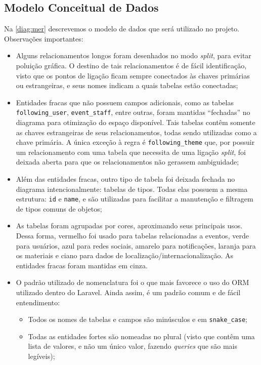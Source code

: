 \documentclass[12pt,a4paper,twoside,hyphens,english,brazil]{abntex2}
\begin{document}
{%
\subsection{Modelo Conceitual de Dados}
Na \autoref{diag:mer} descrevemos o modelo de dados que será utilizado no projeto. Observações importantes:
\begin{itemize}
	\item Alguns relacionamentos longos foram desenhados no modo \emph{split}, para evitar poluição gráfica. O destino de tais relacionamentos é de fácil identificação, visto que os pontos de ligação ficam sempre conectados às chaves primárias ou estrangeiras, e seus nomes indicam a quais tabelas estão conectadas;
	\item Entidades fracas que não possuem campos adicionais, como as tabelas \texttt{following\_user}, \texttt{event\_staff}, entre outras, foram mantidas ``fechadas'' no diagrama para otimização do espaço disponível. Tais tabelas contêm somente as chaves estrangeiras de seus relacionamentos, todas sendo utilizadas como a chave primária. A única exceção à regra é \texttt{following\_theme} que, por possuir um relacionamento com uma tabela que necessita de uma ligação \emph{split}, foi deixada aberta para que os relacionamentos não gerassem ambiguidade;
	\item Além das entidades fracas, outro tipo de tabela foi deixada fechada no diagrama intencionalmente: tabelas de tipos. Todas elas possuem a mesma estrutura: \texttt{id} e \texttt{name}, e são utilizadas para facilitar a manutenção e filtragem de tipos comuns de objetos;
	\item As tabelas foram agrupadas por cores, aproximando seus principais usos. Dessa forma, vermelho foi usado para tabelas relacionadas a eventos, verde para usuários, azul para redes sociais, amarelo para notificações, laranja para os materiais e ciano para dados de localização/internacionalização. As entidades fracas foram mantidas em cinza.
	\item O padrão utilizado de nomenclatura foi o que mais favorece o uso do ORM utilizado dentro do Laravel. Ainda assim, é um padrão comum e de fácil entendimento:
		\begin{itemize}
			\item Todos os nomes de tabelas e campos são minúsculos e em \texttt{snake\_case};
			\item Todas as entidades fortes são nomeadas no plural (visto que contêm uma lista de valores, e não um único valor, fazendo \emph{queries} que são mais legíveis);

\end{itemize}
\end{itemize}}
\end{document}
